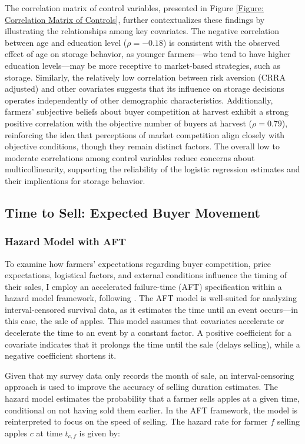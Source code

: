 The correlation matrix of control variables, presented in Figure \ref{Figure: Correlation Matrix of Controls}, further contextualizes these findings by illustrating the relationships among key covariates. The negative correlation between age and education level (\(\rho = -0.18\)) is consistent with the observed effect of age on storage behavior, as younger farmers---who tend to have higher education levels---may be more receptive to market-based strategies, such as storage. Similarly, the relatively low correlation between risk aversion (CRRA adjusted) and other covariates suggests that its influence on storage decisions operates independently of other demographic characteristics. Additionally, farmers' subjective beliefs about buyer competition at harvest exhibit a strong positive correlation with the objective number of buyers at harvest (\(\rho = 0.79\)), reinforcing the idea that perceptions of market competition align closely with objective conditions, though they remain distinct factors. The overall low to moderate correlations among control variables reduce concerns about multicollinearity, supporting the reliability of the logistic regression estimates and their implications for storage behavior.



\subsection{Time to Sell: Expected Buyer Movement}

\subsubsection{Hazard Model with AFT}
\noindent 
To examine how farmers' expectations regarding buyer competition, price expectations, logistical factors, and external conditions influence the timing of their sales, I employ an accelerated failure-time (AFT) specification within a hazard model framework, following \cite{albuquerque2024market}. The AFT model is well-suited for analyzing interval-censored survival data, as it estimates the time until an event occurs---in this case, the sale of apples. This model assumes that covariates accelerate or decelerate the time to an event by a constant factor. A positive coefficient for a covariate indicates that it prolongs the time until the sale (delays selling), while a negative coefficient shortens it.

Given that my survey data only records the month of sale, an interval-censoring approach is used to improve the accuracy of selling duration estimates. The hazard model estimates the probability that a farmer sells apples at a given time, conditional on not having sold them earlier. In the AFT framework, the model is reinterpreted to focus on the speed of selling. The hazard rate for farmer \(f\) selling apples \(c\) at time \(t_{c,f}\) is given by:

